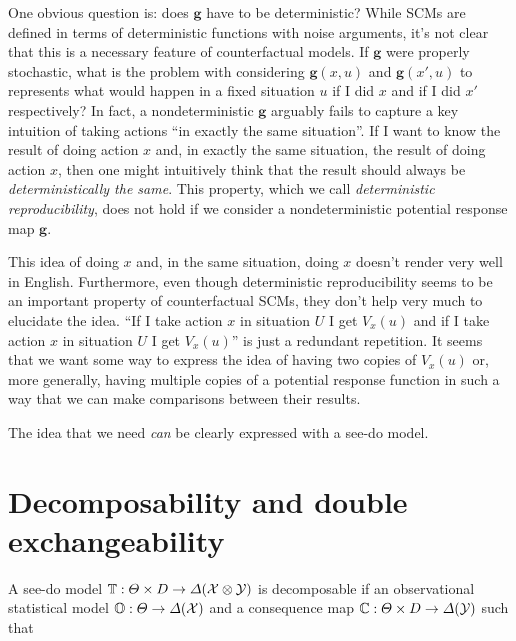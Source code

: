One obvious question is: does $\mathbf{g}$ have to be deterministic? While SCMs are defined in terms of deterministic functions with noise arguments, it's not clear that this is a necessary feature of counterfactual models. If $\mathbf{g}$ were properly stochastic, what is the problem with considering $\mathbf{g}(x,u)$ and $\mathbf{g}(x',u)$ to represents what would happen in a fixed situation $u$ if I did $x$ and if I did $x'$ respectively? In fact, a nondeterministic $\mathbf{g}$  arguably fails to capture a key intuition of taking actions ``in exactly the same situation''. If I want to know the result of doing action $x$ and, in exactly the same situation, the result of doing action $x$, then one might intuitively think that the result should always be \emph{deterministically the same}. This property, which we call \emph{deterministic reproducibility}, does not hold if we consider a nondeterministic potential response map $\mathbf{g}$.

This idea of doing $x$ and, in the same situation, doing $x$ doesn't render very well in English. Furthermore, even though deterministic reproducibility seems to be an important property of counterfactual SCMs, they don't help very much to elucidate the idea. ``If I take action $x$ in situation $U$ I get $V_x(u)$ and if I take action $x$ in situation $U$ I get $V_x(u)$'' is just a redundant repetition. It seems that we want some way to express the idea of having two copies of $V_x(u)$ or, more generally, having multiple copies of a potential response function in such a way that we can make comparisons between their results.

The idea that we need \emph{can} be clearly expressed with a see-do model. 


\section{Decomposability and double exchangeability}

A see-do model $\mathbb{T}:\Theta\times D\to \Delta(\mathcal{X}\otimes\mathcal{Y})$ is decomposable if an observational statistical model $\mathbb{O}:\Theta\to \Delta(\mathcal{X})$ and a consequence map $\mathbb{C}:\Theta\times D\to \Delta(\mathcal{Y})$ such that 


